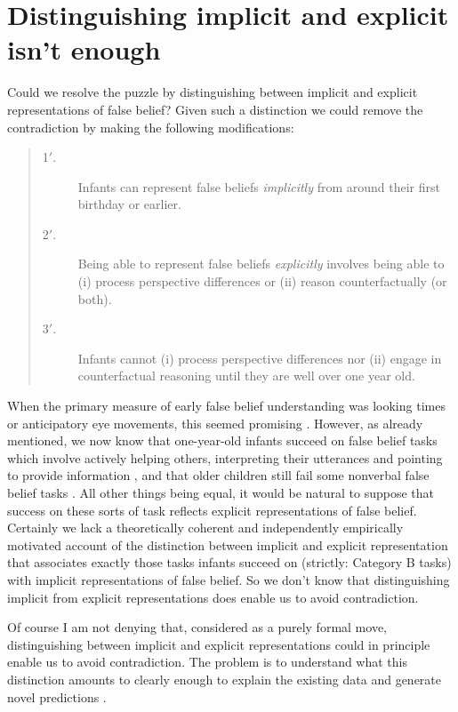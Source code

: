 \documentclass[12pt,\papersize]{extarticle}
\begin{document}
\section{Distinguishing implicit and explicit isn't enough}
Could we resolve the puzzle by distinguishing between implicit and explicit representations of false belief?
Given such a distinction we could remove the contradiction by making the following modifications:
%
\begin{quote}
\begin{description}
\item[1$'$.] Infants can represent false beliefs \emph{implicitly} from around their first birthday or earlier. \label{infant_fb_prime}

\item[2$'$.] Being able to represent false beliefs \emph{explicitly}  involves being able to  (i) process perspective differences or (ii) reason counterfactually (or both). \label{fb_is_perspectives_prime}

\item[3$'$.] Infants cannot (i) process perspective differences nor (ii) engage in counterfactual reasoning until they are well over one year old.  \label{infant_perspectives}
\end{description}
\end{quote}
%
When the primary measure of early false belief understanding was  looking times or anticipatory eye movements, this seemed promising \citep{Clements:1994cw,Clements:2000nc,Garnham:2001ql,Ruffman:2001ng}.
However, as already mentioned, we now know that one-year-old infants succeed on false belief tasks which involve actively helping others, interpreting their utterances and pointing to provide information \citep{en_1783,Knudsen:2011fk,southgate:2010fb},
and that older children still fail some nonverbal false belief tasks \citep{Call:1999co}.
All other things being equal, it would be natural to suppose that success on these sorts of task reflects explicit representations of false belief.
Certainly we lack a theoretically coherent and independently empirically motivated account of the distinction between implicit and explicit representation that associates exactly those tasks infants succeed on (strictly: Category B tasks) with implicit representations of false belief.
So we don't know that distinguishing implicit from explicit representations does enable us to avoid contradiction.

Of course I am not denying that, considered as a purely formal move, distinguishing between implicit and explicit representations could in principle enable us to avoid contradiction.
The problem is to understand what this distinction amounts to clearly enough to explain the existing data and generate novel predictions \citep[p.\ 154]{Apperly:2010kx}.
\end{document}
